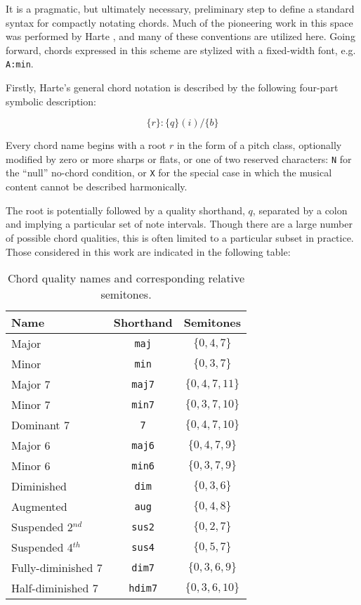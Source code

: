 It is a pragmatic, but ultimately necessary, preliminary step to define a standard syntax for compactly notating chords.
Much of the pioneering work in this space was performed by Harte \cite{Harte2010}, and many of these conventions are utilized here.
Going forward, chords expressed in this scheme are stylized with a fixed-width font, e.g. \texttt{A:min}.

Firstly, Harte's general chord notation is described by the following four-part symbolic description:

\begin{equation}
\{r\}:\{q\}(i)/\{b\}
\end{equation}

\noindent Every chord name begins with a root $r$ in the form of a pitch class, optionally modified by zero or more sharps or flats, or one of two reserved characters: \texttt{N} for the ``null'' no-chord condition, or \texttt{X} for the special case in which the musical content cannot be described harmonically.

The root is potentially followed by a quality shorthand, $q$, separated by a colon and implying a particular set of note intervals.
Though there are a large number of possible chord qualities, this is often limited to a particular subset in practice.
Those considered in this work are indicated in the following table:

\begin{table}[t]
\begin{center}
\caption{Chord quality names and corresponding relative semitones.}
\label{tab:qualities}
\begin{tabular}{l | c | c}
Name & Shorthand & Semitones \\
\hline
Major & \texttt{maj} & $\{0, 4, 7\}$ \\
Minor & \texttt{min} & $\{0, 3, 7\}$ \\
Major 7 & \texttt{maj7} & $\{0, 4, 7, 11\}$ \\
Minor 7 & \texttt{min7} & $\{0, 3, 7, 10\}$ \\
Dominant 7 & \texttt{7} & $\{0, 4, 7, 10\}$ \\
Major 6 & \texttt{maj6} & $\{0, 4, 7, 9\}$ \\
Minor 6 & \texttt{min6} & $\{0, 3, 7, 9\}$ \\
Diminished & \texttt{dim} & $\{0, 3, 6\}$ \\
Augmented & \texttt{aug} & $\{0, 4, 8\}$ \\
Suspended 2$^{nd}$ & \texttt{sus2} & $\{0, 2, 7\}$ \\
Suspended 4$^{th}$ & \texttt{sus4} & $\{0, 5, 7\}$ \\
Fully-diminished 7 & \texttt{dim7} & $\{0, 3, 6, 9\}$ \\
Half-diminished 7 & \texttt{hdim7} & $\{0, 3, 6, 10\}$ \\
\hline
\end{tabular}
\end{center}
\end{table}


